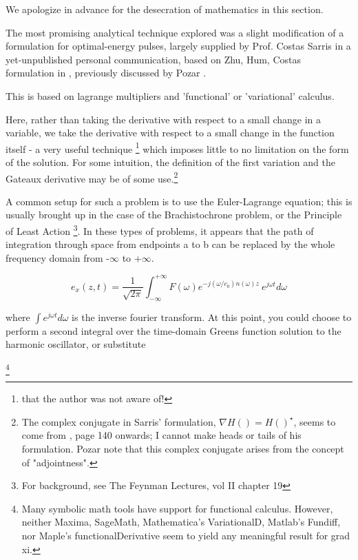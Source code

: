 \documentclass[paper.tex]{subfiles}
\begin{document}
We apologize in advance for the desecration of mathematics in this section.

The most promising analytical technique explored was a slight modification of a formulation for optimal-energy pulses, largely supplied by Prof. Costas Sarris in a yet-unpublished personal communication, based on Zhu, Hum, Costas formulation in \cite{Microwave2012b}, previously discussed by Pozar \cite{Waveform2003}. 

This is based on lagrange multipliers and 'functional' or 'variational' calculus\cite{Methods1989}. 

Here, rather than taking the derivative with respect to a small change in a variable, we take the derivative with respect to a small change in the function itself - a very useful technique \footnote{that the author was not aware of!} which imposes little to no limitation on the form of the solution. For some intuition, the definition of the first variation and the Gateaux derivative may be of some use.\footnote{The complex conjugate in Sarris' formulation, $\nabla H() = H()^\star$, seems to come from \cite{Signal1969}, page 140 onwards; I cannot make heads or tails of his formulation. Pozar note that this complex conjugate arises from the concept of "adjointness".}

A common setup for such a problem is to use the Euler-Lagrange equation; this is usually brought up in the case of the Brachistochrone problem, or the Principle of Least Action \footnote{For background, see The Feynman Lectures, vol II chapter 19}. In these types of problems, it appears that the path of integration through space from endpoints a to b can be replaced by the whole frequency domain from -$\infty$ to +$\infty$. 

$$ e_x(z,t) = \frac{1}{\sqrt{2 \pi}} \int_{-\infty}^{+\infty}{F(\omega) e^{- j (\omega/c_0)n(\omega)z}\ e^{j\omega t} d\omega} $$

where $\int e^{j \omega t} d\omega$ is the inverse fourier transform. At this point, you could choose to perform a second integral over the time-domain Greens function solution to the harmonic oscillator\cite{Complex2020}, or substitute 

\footnote{Many symbolic math tools have support for functional calculus. However, neither Maxima, SageMath, Mathematica's VariationalD, Matlab's Fundiff, nor Maple's functionalDerivative seem to yield any meaningful result for grad xi.}\\
\end{document}
